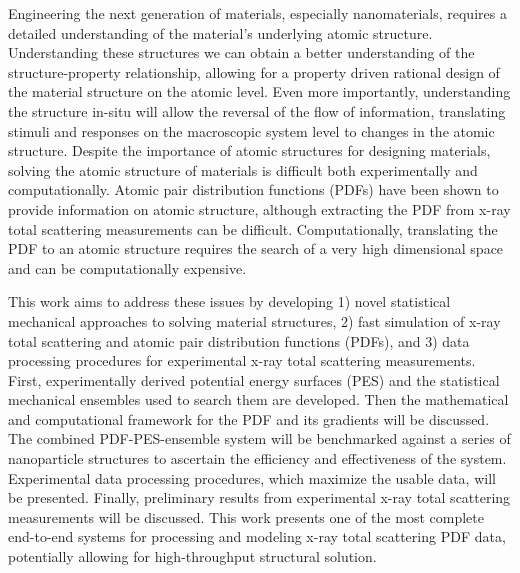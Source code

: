 Engineering the next generation of materials, especially nanomaterials, requires a detailed understanding of the material's underlying atomic structure.
 Understanding these structures we can obtain a better understanding of the structure-property relationship, allowing for a property driven rational design of the material structure on the atomic level.
 Even more importantly, understanding the structure in-situ will allow the reversal of the flow of information, translating stimuli and responses on the macroscopic system level to changes in the atomic structure.
 Despite the importance of atomic structures for designing materials, solving the atomic structure of materials is difficult both experimentally and computationally.
 Atomic pair distribution functions (PDFs) have been shown to provide information on atomic structure, although extracting the PDF from x-ray total scattering measurements can be difficult.
 Computationally, translating the PDF to an atomic structure requires the search of a very high dimensional space and can be computationally expensive.

This work aims to address these issues by developing 1) novel statistical mechanical approaches to solving material structures, 2)  fast simulation of x-ray total scattering and atomic pair distribution functions (PDFs), and 3) data processing procedures for experimental x-ray total scattering measurements.
First, experimentally derived potential energy surfaces (PES) and the statistical mechanical ensembles used to search them are developed.
Then the mathematical and computational framework for the PDF and its gradients will be discussed.
The combined PDF-PES-ensemble system will be benchmarked against a series of nanoparticle structures to ascertain the efficiency and effectiveness of the system.
Experimental data processing procedures, which maximize the usable data, will be presented.
Finally, preliminary results from experimental x-ray total scattering measurements will be discussed.
This work presents one of the most complete end-to-end systems for processing and modeling x-ray total scattering PDF data, potentially allowing for high-throughput structural solution.